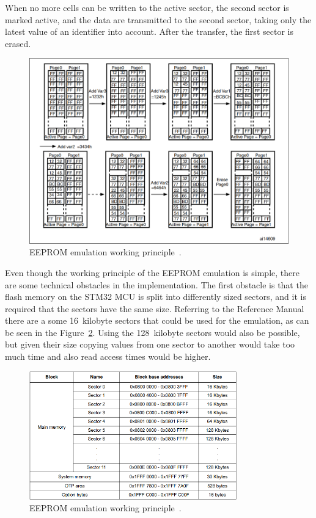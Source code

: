 When no more cells can be written to the active sector, the second sector is marked active, and the data are transmitted to the second sector, taking only the latest value of an identifier into account.
After the transfer, the first sector is erased.

\begin{figure}[H]
    \centering
    \includegraphics[width=\textwidth]{obrazky/eeprom_emul_principle}
    \caption{EEPROM emulation working principle~\cite{stmicro_an3969_2011}.}
    \label{fig:eeprom_emul}
\end{figure}

Even though the working principle of the EEPROM emulation is simple, there are some technical obstacles in the implementation.
The first obstacle is that the flash memory on the STM32 MCU is split into differently sized sectors, and it is required that the sectors have the same size.
Referring to the Reference Manual~\cite{stmicro_stm32f405rg_nodate} there are a some 16~kilobyte sectors that could be used for the emulation, as can be seen in the Figure~\ref{fig:flash_layout}.
Using the 128~kilobyte sectors would also be possible, but given their size copying values from one sector to another would take too much time and also read access times would be higher.

\begin{figure}[H]
    \centering
    \includegraphics[width=0.8\textwidth]{obrazky/flash_stm}
    \caption{EEPROM emulation working principle~\cite{stmicro_stm32f405rg_nodate}.}
    \label{fig:flash_layout}
\end{figure}


